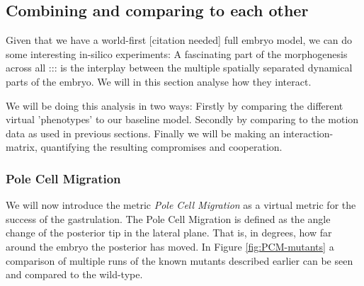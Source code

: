 


\subsection{Combining and comparing to each other}
Given that we have a world-first [citation needed] full embryo model, we can do some interesting in-silico experiments: A fascinating part of the morphogenesis across all ::: is the interplay between the multiple spatially separated dynamical parts of the embryo. We will in this section analyse how they interact. 

We will be doing this analysis in two ways: Firstly by comparing the different virtual 'phenotypes' to our baseline model. Secondly by comparing to the motion data as used in previous sections. Finally we will be making an interaction-matrix, quantifying the resulting compromises and cooperation.  

\subsubsection{Pole Cell Migration}

We will now introduce the metric \textit{Pole Cell Migration} as a virtual metric for the success of the gastrulation. The Pole Cell Migration is defined as the angle change of the posterior tip in the lateral plane. That is, in degrees, how far around the embryo the posterior has moved. In Figure \ref{fig:PCM-mutants} a comparison of multiple runs of the known mutants described earlier can be seen and compared to the wild-type.

